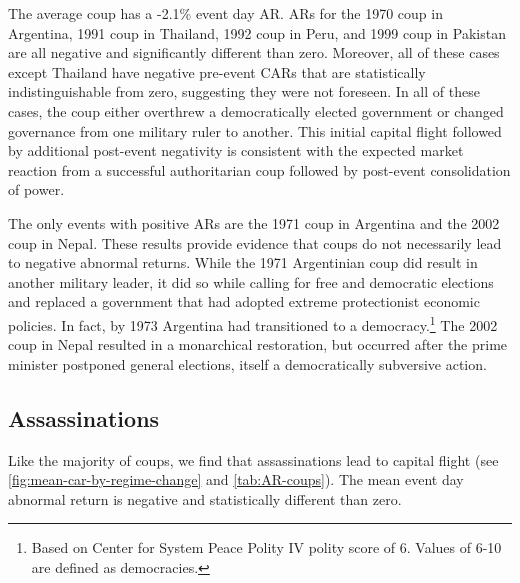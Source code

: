 \documentclass[12pt,final,fleqn]{article}
\theoremstyle{plain}
\begin{document}
The average coup has a -2.1\% event day AR. ARs for the 1970 coup in Argentina,  1991 coup in Thailand, 1992 coup in Peru, and 1999 coup in Pakistan are all negative and significantly different than zero. Moreover, all of these cases except Thailand have negative pre-event CARs that are statistically indistinguishable from zero, suggesting they were not foreseen. In all of these cases, the coup either overthrew a democratically elected government or changed governance from one military ruler to another. This initial capital flight followed by additional post-event negativity is consistent with the expected market reaction from a successful authoritarian coup followed by post-event consolidation of power. 


The only events with positive ARs are the 1971 coup in Argentina and the 2002 coup in Nepal. These results provide evidence that coups do not necessarily lead to negative abnormal returns. While the 1971 Argentinian coup did result in another military leader, it did so while calling for free and democratic elections and replaced a government that had adopted extreme protectionist economic policies. In fact, by 1973 Argentina had transitioned to a democracy.\footnote{Based on Center for System Peace Polity IV polity score of 6. Values of 6-10 are defined as democracies.} The 2002 coup in Nepal resulted in a monarchical restoration, but occurred after the prime minister postponed general elections, itself a democratically subversive action.  

\subsection{Assassinations} \label{subsec: Assassinations}

Like the majority of coups, we find that assassinations lead to capital flight (see \autoref{fig:mean-car-by-regime-change} and \autoref{tab:AR-coups}). The mean event day abnormal return is negative and statistically different than zero. 

\end{document}
